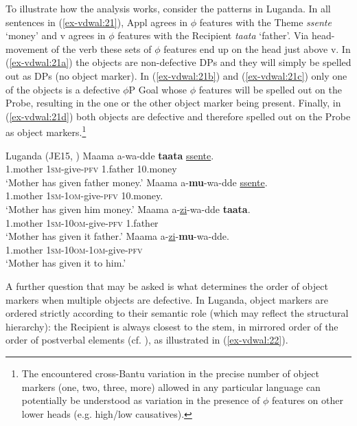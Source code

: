 \documentclass[output=paper
,modfonts
,nonflat]{langsci/langscibook}
\begin{document}
\noindent To illustrate how the analysis works, consider the patterns in Luganda. In all sentences in (\ref{ex-vdwal:21}), Appl agrees in $\phi $ features with the Theme \textit{ssente} ‘money’ and v agrees in $\phi$ features with the Recipient \textit{taata} ‘father’. Via head-movement of the verb these sets of $\phi$ features end up on the head just above v. In (\ref{ex-vdwal:21a}) the objects are non-defective DPs and they will simply be spelled out as DPs (no object marker). In (\ref{ex-vdwal:21b}) and (\ref{ex-vdwal:21c}) only one of the objects is a defective $\phi$P Goal whose $\phi$ features will be spelled out on the Probe, resulting in the one or the other object marker being present. Finally, in (\ref{ex-vdwal:21d}) both objects are defective and therefore spelled out on the Probe as object markers.\footnote{The encountered cross-Bantu variation in the precise number of object markers (one, two, three, more) allowed in any particular language \citep{Polak1986, Marlo2015} can potentially be understood as variation in the presence of $\phi$ features on other lower heads (e.g. high/low causatives).}

\begin{exe}
\ex	Luganda (JE15, \citealt[67, 72]{Ssekiryango2006}) \label{ex-vdwal:21}
	\xlist
	\ex \label{ex-vdwal:21a}
		\gll Maama a-wa-dde \textbf{taata} \uline{ssente}.\\
		1.mother \textsc{1sm}-give-\textsc{pfv} 1.father 10.money \\ 
		\glt `Mother has given father money.'
	\ex  \label{ex-vdwal:21b}
		\gll  Maama a-\textbf{mu}-wa-dde \uline{ssente}. \\
		1.mother \textsc{1sm}-\textsc{1om}-give-\textsc{pfv} 10.money. \\
		\glt `Mother has given him money.'
	\ex  \label{ex-vdwal:21c}
		\gll Maama a-\uline{zi}-wa-dde \textbf{taata}.\\
		1.mother \textsc{1sm}-\textsc{10om-}give-\textsc{pfv} 1.father\\
		\glt `Mother has given it father.'
	\ex  \label{ex-vdwal:21d}
		\gll Maama a-\uline{zi}-\textbf{mu}-wa-dde.\\
		1.mother \textsc{1sm}-\textsc{10om-1om-}give-\textsc{pfv}\\  
		\glt `Mother has given it to him.'
	\endxlist
\end{exe}
A further question that may be asked is what determines the order of object markers when multiple objects are defective. In Luganda, object markers are ordered strictly according to their semantic role (which may reflect the structural hierarchy): the Recipient is always closest to the stem, in mirrored order of the order of postverbal elements (cf. \citealt{Baker1985, Baker1988}), as illustrated in (\ref{ex-vdwal:22}).
\end{document}
